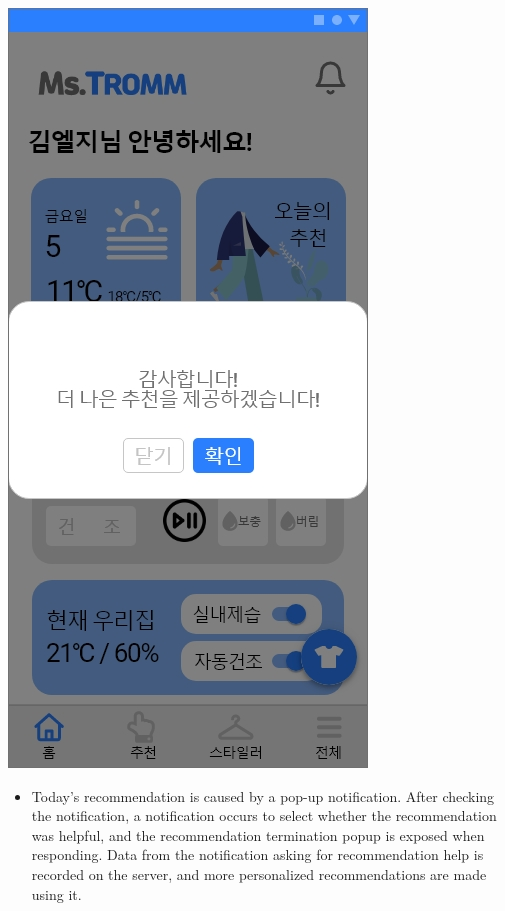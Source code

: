 \documentclass[conference]{IEEEtran}
\begin{document}
\begin{enumerate}
        \centerline{\includegraphics[scale=0.24]{assets/오늘의 추천 팝업3.jpg}}
        \begin{itemize}
            \item[] Today's recommendation is caused by a pop-up notification. After checking the notification, a notification occurs to select whether the recommendation was helpful, and the recommendation termination popup is exposed when responding. Data from the notification asking for recommendation help is recorded on the server, and more personalized recommendations are made using it.\\ 
        \end{itemize}
        
    \break
        

\end{enumerate}
\end{document}
